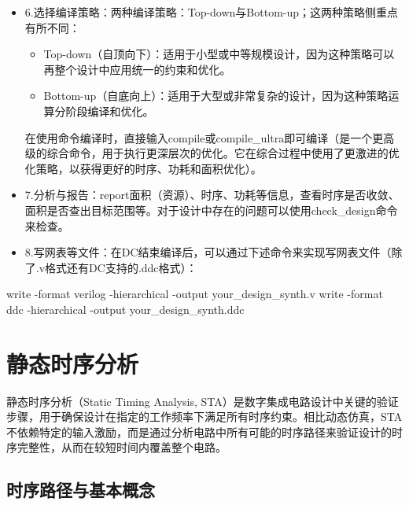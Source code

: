 \begin{itemize}
\item
  6.选择编译策略：两种编译策略：Top-down与Bottom-up；这两种策略侧重点有所不同：

  \begin{itemize}
  \tightlist
  \item
    Top-down（自顶向下）：适用于小型或中等规模设计，因为这种策略可以再整个设计中应用统一的约束和优化。
  \item
    Bottom-up（自底向上）：适用于大型或非常复杂的设计，因为这种策略运算分阶段编译和优化。
  \end{itemize}

  在使用命令编译时，直接输入compile或compile\_ultra即可编译（是一个更高级的综合命令，用于执行更深层次的优化。它在综合过程中使用了更激进的优化策略，以获得更好的时序、功耗和面积优化）。
\item
  7.分析与报告：report面积（资源）、时序、功耗等信息，查看时序是否收敛、面积是否查出目标范围等。对于设计中存在的问题可以使用check\_design命令来检查。
\item
  8.写网表等文件：在DC结束编译后，可以通过下述命令来实现写网表文件（除了.v格式还有DC支持的.ddc格式）：
\end{itemize}

\begin{CodeBlock}[language=BookTcl]
write -format verilog -hierarchical -output your_design_synth.v
write -format ddc -hierarchical -output your_design_synth.ddc
\end{CodeBlock}

\section{静态时序分析}\label{sec:16-chip-frontend-021}

静态时序分析（Static Timing Analysis,
STA）是数字集成电路设计中关键的验证步骤，用于确保设计在指定的工作频率下满足所有时序约束。相比动态仿真，STA不依赖特定的输入激励，而是通过分析电路中所有可能的时序路径来验证设计的时序完整性，从而在较短时间内覆盖整个电路。

\subsection{时序路径与基本概念}\label{sec:16-chip-frontend-022}

